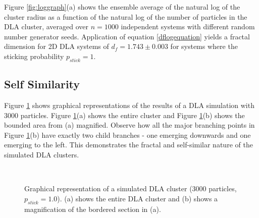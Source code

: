 \documentclass[11pt]{iopart}
\begin{document}
Figure \ref{fig:loggraph}(a) shows the ensemble average of the natural log of the cluster radius as a function of the natural log of the number of particles in the DLA cluster, averaged over $n=1000$ independent systems with different random number generator seeds. Application of equation \ref{dflogequation} yields a fractal dimension for 2D DLA systems of $d_f = 1.743 \pm 0.003$ for systems where the sticking probability $p_{stick} = 1$.

\subsection{Self Similarity}

Figure \ref{fig:selfsimilar} shows graphical representations of the results of a DLA simulation with 3000 particles. Figure \ref{fig:selfsimilar}(a) shows the entire cluster and Figure \ref{fig:selfsimilar}(b) shows the bounded area from (a) magnified. Observe how all the major branching points in Figure \ref{fig:selfsimilar}(b) have exactly two child branches - one emerging downwards and one emerging to the left. This demonstrates the fractal and self-similar nature of the simulated DLA clusters.

\begin{figure}[t]
    \centering
    \quad
     \\
 
    \caption{Graphical representation of a simulated DLA cluster (3000 particles, $p_{stick} = 1.0$). (a) shows the entire DLA cluster and (b) shows a magnification of the bordered section in (a).}
    \label{fig:selfsimilar}
\end{figure}
\end{document}
